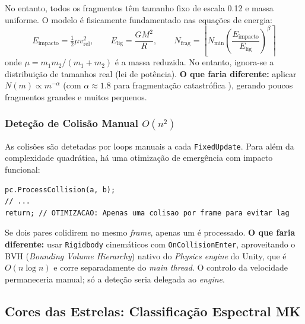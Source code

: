 \documentclass[12pt,a4paper]{article}
\begin{document}
No entanto, todos os fragmentos t\^{e}m tamanho fixo de escala 0.12 e massa uniforme. O modelo \'{e} fisicamente fundamentado nas equa\c{c}\~{o}es de energia:
\begin{equation}
E_{\text{impacto}} = \tfrac{1}{2} \mu v_{\text{rel}}^2, \qquad
E_{\text{lig}} = \frac{G M^2}{R}, \qquad
N_{\text{frag}} = \left\lfloor N_{\min} \left(\frac{E_{\text{impacto}}}{E_{\text{lig}}}\right)^{\!\beta} \right\rceil
\end{equation}
onde $\mu = m_1 m_2/(m_1+m_2)$ \'{e} a massa reduzida. No entanto, ignora-se a distribui\c{c}\~{a}o de tamanhos real (lei de pot\^{e}ncia). \textbf{O que faria diferente:} aplicar $N(m) \propto m^{-\alpha}$ (com $\alpha \approx 1.8$ para fragmenta\c{c}\~{a}o catastr\'{o}fica \cite{benz1999,leinhardt2012}), gerando poucos fragmentos grandes e muitos pequenos.

\subsubsection{Dete\c{c}\~{a}o de Colis\~{a}o Manual $O(n^2)$}

As colis\~{o}es s\~{a}o detetadas por loops manuais a cada \texttt{FixedUpdate}. Para al\'{e}m da complexidade quadr\'{a}tica, h\'{a} uma otimiza\c{c}\~{a}o de emerg\^{e}ncia com impacto funcional:

\begin{lstlisting}[caption={StarSystemManager.cs - apenas uma colis\~{a}o processada por frame}]
pc.ProcessCollision(a, b);
// ...
return; // OTIMIZACAO: Apenas uma colisao por frame para evitar lag
\end{lstlisting}

Se dois pares colidirem no mesmo \textit{frame}, apenas um \'{e} processado. \textbf{O que faria diferente:} usar \texttt{Rigidbody} cinem\'{a}ticos com \texttt{OnCollisionEnter}, aproveitando o BVH (\textit{Bounding Volume Hierarchy}) nativo do \textit{Physics engine} do Unity, que \'{e} $O(n \log n)$ e corre separadamente do \textit{main thread}. O controlo da velocidade permaneceria manual; s\'{o} a dete\c{c}\~{a}o seria delegada ao \textit{engine}.

\subsection{Cores das Estrelas: Classifica\c{c}\~{a}o Espectral MK}
\end{document}
